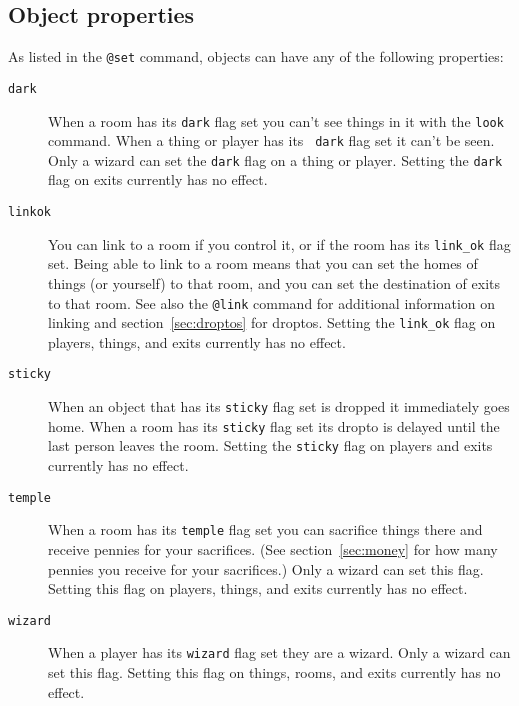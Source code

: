\subsection{Object properties}
\label{sec:object-properties}

As listed in the \verb|@set| command, objects can have any of the
following properties:
\begin{description}
\item[{\tt dark}]
When a room has its {\tt dark} flag set you can't see things in it
with the {\tt look} command.  When a thing or player has its {\tt
dark} flag set it can't be seen.  Only a wizard can set the {\tt dark}
flag on a thing or player.  Setting the {\tt dark} flag on exits
currently has no effect.

\item[{\tt link{\ub}ok}]
You can link to a room if you control it, or if the room has its
\verb|link_ok| flag set.  Being able to link to a room means that you
can set the homes of things (or yourself) to that room,
and you can set the destination of exits to that room.  See also the
{\tt @link} command for additional information on linking and
section~\ref{sec:droptos} for droptos.  Setting the
\verb|link_ok| flag on players, things, and exits currently has no
effect.

\item[{\tt sticky}]
When an object that has its {\tt sticky} flag set is dropped it
immediately goes home.  When a room has its {\tt sticky} flag set its
dropto is delayed until the last person leaves the room.  Setting the
{\tt sticky} flag on players and exits currently has no effect.

\item[{\tt temple}]
When a room has its {\tt temple} flag set you can sacrifice things
there and receive pennies for your sacrifices.  (See
section~\ref{sec:money} for how many pennies you receive for your
sacrifices.)  Only a wizard can set this flag.  Setting this flag on
players, things, and exits currently has no effect.

\item[{\tt wizard}]
When a player has its {\tt wizard} flag set they are a wizard.  Only a
wizard can set this flag.  Setting this flag on things, rooms, and
exits currently has no effect.

\end{description}

